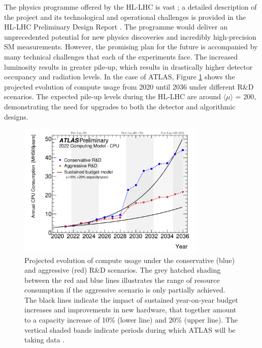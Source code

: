 The physics programme offered by the HL-LHC is vast \cite{big-report}; a detailed description of the project and its technological and operational challenges is provided in the HL-LHC Preliminary Design Report \cite{Apollinari:2116337}. The programme would deliver an unprecedented potential for new physics discoveries and incredibly high-precision SM measurements. However, the promising plan for the future is accompanied by many technical challenges that each of the experiments face. The increased luminosity results in greater pile-up, which results in drastically higher detector occupancy and radiation levels. In the case of ATLAS, Figure \ref{fig:pileup-walltime} shows the projected evolution of compute usage from 2020 until 2036 under different R\&D scenarios. The expected pile-up levels during the HL-LHC are around $\langle \mu \rangle$ = 200, demonstrating the need for upgrades to both the detector and algorithmic designs.

\begin{figure}[!htbp]
  \centering
  \includegraphics[width=0.8\textwidth]{images/2-LHC-ATLAS/computing-model.png}
  \caption{
    Projected evolution of compute usage under the conservative (blue) and aggressive (red) R\&D scenarios. The grey hatched shading between the red and blue lines illustrates the range of resource consumption if the aggressive scenario is only partially achieved. The black lines indicate the impact of sustained year-on-year budget increases and improvements in new hardware, that together amount to a capacity increase of 10\% (lower line) and 20\% (upper line). The vertical shaded bands indicate periods during which ATLAS will be taking data \cite{Collaboration:2802918}.
  }
  \label{fig:pileup-walltime}
\end{figure}


